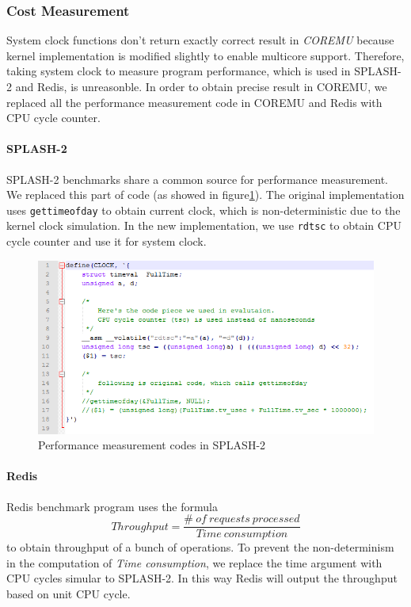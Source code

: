 \subsubsection{Cost Measurement}
System clock functions don't return exactly correct result in \emph{COREMU} 
because kernel implementation is modified slightly to enable multicore support.
Therefore, taking system clock to measure program performance, which is used in
SPLASH-2 and Redis, is unreasonble. In order to obtain precise result in COREMU,
we replaced all the performance measurement code in COREMU and Redis with 
CPU cycle counter. 

\paragraph{SPLASH-2} SPLASH-2 benchmarks share a common source for performance 
measurement. 
We replaced this part of code (as showed in figure\ref{fig:cyclecounter}). 
The original implementation uses \texttt{gettimeofday} to obtain current clock, 
which is non-deterministic due to the kernel clock simulation. In the new 
implementation, we use \texttt{rdtsc} to obtain CPU cycle counter and use it
for system clock. 
\begin{figure}[H]
\center
\includegraphics[width=0.8\linewidth]{figures/cycle_counter_codes.png}
\caption{Performance measurement codes in SPLASH-2}
\label{fig:cyclecounter}
\end{figure}

\paragraph{Redis}
Redis benchmark program uses the formula
\begin{equation}
Throughput = \frac{\# \ of \ requests\ processed}{Time\ consumption}
\end{equation}
to obtain throughput of a bunch of operations. To prevent the non-determinism 
in the computation of \emph{Time consumption}, we replace the time argument 
with CPU cycles simular to SPLASH-2. In this way Redis will output the throughput
based on unit CPU cycle.

